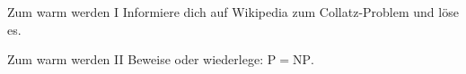 \documentclass{uebblatt}
\begin{document}

\begin{aufgabe}{Zum warm werden I}
Informiere dich auf Wikipedia zum Collatz-Problem und löse es.
\end{aufgabe}

\begin{aufgabe}{Zum warm werden II}
Beweise oder wiederlege: $\mathrm{P} = \mathrm{NP}$.
\end{aufgabe}
\end{document}

